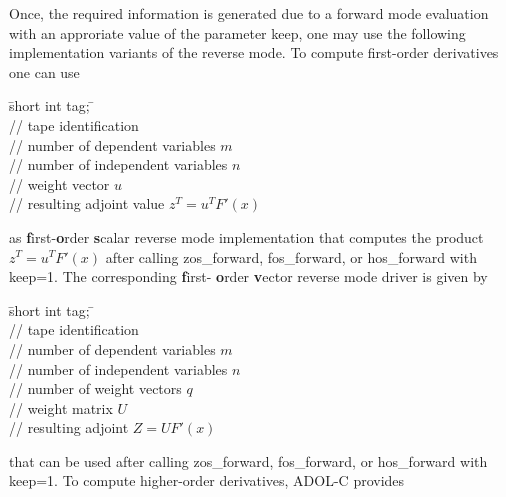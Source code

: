 \documentclass[11pt,twoside]{article}
\begin{document}
Once, the required information is generated due to a forward mode evaluation
with an approriate value of the parameter {\sf keep}, one may use the
following implementation variants of the reverse mode. To compute first-order derivatives
one can use
\begin{tabbing}
\hspace{0.5in}\={\sf short int tag;} \hspace{1.1in}\= \kill    %
\\
         \> // tape identification \\
                 \> // number of  dependent variables $m$\\
                 \> // number of independent variables $n$\\
           \> // weight vector $u$\\
           \> // resulting adjoint value $z^T=u^T F'(x)$
\end{tabbing}                 
as {\bf f}irst-{\bf o}rder {\bf s}calar reverse mode implementation that computes
the product $z^T=u^T F'(x)$ after calling  {\sf zos\_forward}, {\sf fos\_forward}, or 
{\sf hos\_forward} with {\sf keep}=1. The corresponding {\bf f}irst-{\bf
  o}rder {\bf v}ector reverse mode driver is given by
\begin{tabbing}
\hspace{0.5in}\={\sf short int tag;} \hspace{1.1in}\= \kill    %
\\
         \> // tape identification \\
                 \> // number of  dependent variables $m$\\
                 \> // number of independent variables $n$\\
                 \> // number of weight vectors $q$\\
        \> // weight matrix $U$\\
        \> // resulting adjoint $Z=U F'(x)$
\end{tabbing}                 
that can be used after calling  {\sf zos\_forward}, {\sf fos\_forward}, or 
{\sf hos\_forward} with {\sf keep}=1. To compute higher-order derivatives,
ADOL-C provides
\end{document}
